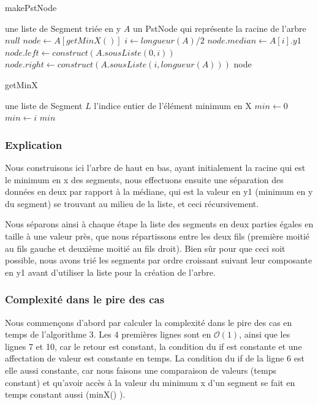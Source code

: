 \documentclass[10pt,a4paper]{article}
\begin{document}
\begin{algorithm}
\caption{makePstNode}
\begin{algorithmic}[1]
\REQUIRE une liste de Segment triée en y $A$ 
\ENSURE un PstNode qui représente la racine de l'arbre
\RETURN $null$
\ENDIF
\STATE $node \leftarrow A[getMinX()] $
\STATE $i \leftarrow longueur(A)/2$
\STATE $node.median \leftarrow A[i].y1 $
\STATE $node.left \leftarrow construct(A.sousListe(0,i)) $
\STATE $node.right \leftarrow construct(A.sousListe(i,longueur(A))) $
\ENDIF
\RETURN node
\end{algorithmic}
\end{algorithm}

\newpage
\begin{algorithm}
\caption{getMinX}
\begin{algorithmic}[1]
\REQUIRE une liste de Segment $L$
\ENSURE l'indice entier de l’élément minimum en X
\ENDIF
\STATE $min \leftarrow 0$
\STATE $min \leftarrow i$
\ENDIF
\ENDFOR
\RETURN $min$
\end{algorithmic}
\end{algorithm}

\subsubsection{Explication}

Nous construisons ici l'arbre de haut en bas, ayant initialement la racine qui est le minimum en x des segments, nous effectuons ensuite une séparation des données en deux par rapport à la médiane, qui est la valeur en y1 (minimum en y du segment) se trouvant au milieu de la liste, et ceci récursivement.

Nous séparons ainsi à chaque étape la liste des segments en deux parties égales en taille à une valeur près, que nous répartissons entre les deux fils (première moitié au fils gauche et deuxième moitié au fils droit). Bien sûr pour que ceci soit possible, nous avons trié les segments par ordre croissant suivant leur composante en y1 avant d'utiliser la liste pour la création de l'arbre.

\subsubsection{Complexité dans le pire des cas}
Nous commençons d'abord par calculer la complexité dans le pire des cas en temps de l'algorithme 3.
Les 4 premières lignes sont en $\mathcal{O} (1)$, ainsi que les lignes 7 et 10, car le retour est constant, la condition du if est constante et une affectation de valeur est constante en temps. La condition du if de la ligne 6 est elle aussi constante, car nous faisons une comparaison de valeurs (temps constant) et qu'avoir accès à la valeur du minimum x d'un segment se fait en temps constant aussi (minX() ).
\end{document}
